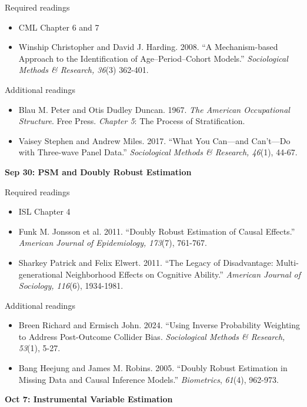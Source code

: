 \documentclass[12pt]{article}
\begin{document}
\noindent Required readings
\begin{itemize}
    \item CML Chapter 6 and 7
    \item Winship Christopher and David J. Harding. 2008. ``A Mechanism-based Approach to the Identification of Age–Period–Cohort Models.'' \textit{Sociological Methods \& Research, 36}(3) 362-401.
\end{itemize}

\noindent Additional readings
\begin{itemize}
    \item Blau M. Peter and Otis Dudley Duncan. 1967. \textit{The American Occupational Structure}. Free Press. \textit{Chapter 5}: The Process of Stratification.
    \item Vaisey Stephen and Andrew Miles. 2017. ``What You Can—and Can’t—Do with Three-wave Panel Data.'' \textit{Sociological Methods \& Research, 46}(1), 44-67.
\end{itemize}

\vspace{1em} \noindent \textbf{\textcolor{titlecolor}{Sep 30: PSM and Doubly Robust Estimation}}

\noindent Required readings
\begin{itemize}
    \item ISL Chapter 4
    \item Funk M. Jonsson et al. 2011. ``Doubly Robust Estimation of Causal Effects.'' \textit{American Journal of Epidemiology, 173}(7), 761-767.
    \item Sharkey Patrick and Felix Elwert. 2011. ``The Legacy of Disadvantage: Multi-generational Neighborhood Effects on Cognitive Ability.'' \textit{American Journal of Sociology, 116}(6), 1934-1981.
\end{itemize}

\noindent Additional readings
\begin{itemize}
    \item Breen Richard and Ermisch John. 2024. ``Using Inverse Probability Weighting to Address Post-Outcome Collider Bias. \textit{Sociological Methods \& Research, 53}(1), 5-27.
    \item Bang Heejung and James M. Robins. 2005. ``Doubly Robust Estimation in Missing Data and Causal Inference Models.'' \textit{Biometrics}, \textit{61}(4), 962-973.
\end{itemize}

\vspace{1em} \noindent \textbf{\textcolor{titlecolor}{Oct 7: Instrumental Variable Estimation}}
\end{document}

